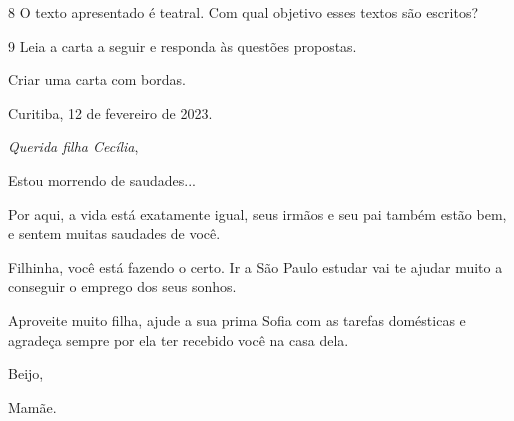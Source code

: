 
\num{8} O texto apresentado é teatral. Com qual objetivo esses textos são
escritos?


\num{9} Leia a carta a seguir e responda às questões propostas.

Criar uma carta com bordas.

\begin{mdframed}[linewidth=10pt,linecolor=salmao!20,backgroundcolor=salmao!20,roundcorner=20pt]
Curitiba, 12 de fevereiro de 2023.

\emph{Querida filha Cecília},

Estou morrendo de saudades...

Por aqui, a vida está exatamente igual, seus irmãos e seu pai também
estão bem, e sentem muitas saudades de você.

Filhinha, você está fazendo o certo. Ir a São Paulo estudar vai te
ajudar muito a conseguir o emprego dos seus sonhos.

Aproveite muito filha, ajude a sua prima Sofia com as tarefas domésticas
e agradeça sempre por ela ter recebido você na casa dela.

\begin{flushright}
Beijo,

Mamãe.
\end{flushright}
\end{mdframed}


